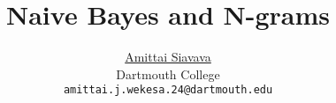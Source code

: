 
\usepackage{arxiv}
\usepackage{amsmath, amsfonts, amsthm, amssymb, amscd, amsxtra}
\usepackage[utf8]{inputenc} %
\usepackage[T1]{fontenc}    %
\usepackage{hyperref}       %
\usepackage{url}            %
\usepackage{booktabs}       %
\usepackage{amsfonts}       %
\usepackage{nicefrac}       %
\usepackage{microtype}      %
\usepackage{cleveref}       %
\usepackage{lipsum}         %
\usepackage{graphicx}
\usepackage{doi}
\usepackage[backend=bibtex,style=numeric]{biblatex}
\usepackage{pgfplots}
\pgfplotsset{compat=1.18}

\usepackage{subcaption}
\usepackage{array, multirow}

\usepackage{float}

\usepackage{enumitem}

\newenvironment{enumalph}{
  \begin{enumerate}[label=(\alph*)]
}{\end{enumerate}}

\newenvironment{enumroman}{
  \begin{enumerate}[label=(\roman*)]
}{\end{enumerate}}

\newenvironment{enumarabic}{
  \begin{enumerate}[label=\textbf{\arabic*.}]
}{\end{enumerate}}

\newenvironment{enumarabic*}{
  \begin{enumerate}[label*=\textbf{\arabic*.}]
}{\end{enumerate}}


\title{Naive Bayes and N-grams}
\author{
	\href{https://amittai.studio}{Amittai Siavava} \\
		Dartmouth College \\
		\texttt{amittai.j.wekesa.24@dartmouth.edu}
}

\renewcommand{\headeright}{Assignment Report}
\renewcommand{\undertitle}{Assignment Report}
\renewcommand{\shorttitle}{}



